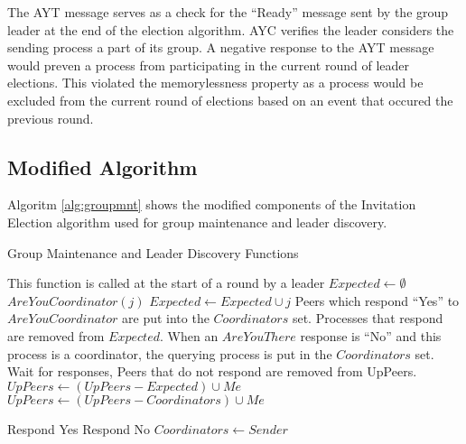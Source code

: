 The \ac{AYT} message serves as a check for the ``Ready'' message sent by the group leader at the end of the election algorithm. \ac{AYC} verifies the leader considers the sending process a part of its group.
A negative response to the \ac{AYT} message would preven a process from participating in the current round of leader elections.
This violated the memorylessness property as a process would be excluded from the current round of elections based on an event that occured the previous round.

\subsection{Modified Algorithm}

Algoritm \ref{alg:groupmnt} shows the modified components of the Invitation Election algorithm used for group maintenance and leader discovery.

\begin{algorithm}
\caption{Group Maintenance and Leader Discovery Functions}
    \label{alg:groupmnt}
\begin{algorithmic}[1]
\small
{}
    \State This function is called at the start of a round by a leader
        \Return
    \EndIf
    \State $Expected \gets \emptyset$
        \State $AreYouCoordinator(j)$
        \State $Expected \gets Expected \cup j$
    \EndFor
    \State Peers which respond ``Yes'' to $AreYouCoordinator$ are put into the $Coordinators$ set.
    \State Processes that respond are removed from $Expected$.
    \State When an $AreYouThere$ response is ``No'' and this process is a coordinator, the querying process is put in the $Coordinators$ set.
    \State Wait for responses, Peers that do not respond are removed from UpPeers.
    \State $UpPeers \gets (UpPeers-Expected) \cup {Me}$
    \State $UpPeers \gets (UpPeers-Coordinators) \cup {Me}$
        \Return
    \EndIf
        \State
    \EndIf
\EndFunction

        \State Respond Yes
    \Else
        \State Respond No
        \State $Coordinators \gets Sender$
    \EndIf
\EndFunction
\end{algorithmic}
\end{algorithm}

